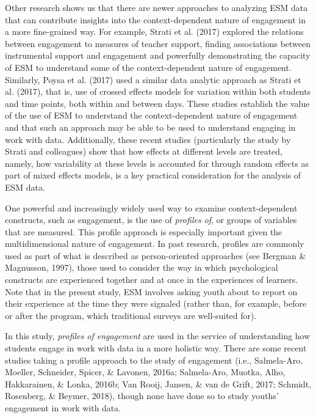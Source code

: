 \documentclass[]{msu-thesis}
\theoremstyle{definition}
\theoremstyle{definition}
\theoremstyle{definition}
\theoremstyle{remark}
\begin{document}
Other research shows us that there are newer approaches to analyzing ESM
data that can contribute insights into the context-dependent nature of
engagement in a more fine-grained way. For example, Strati et al. (2017)
explored the relations between engagement to measures of teacher
support, finding associations between instrumental support and
engagement and powerfully demonstrating the capacity of ESM to
understand some of the context-dependent nature of engagement.
Similarly, Poysa et al. (2017) used a similar data analytic approach as
Strati et al. (2017), that is, use of crossed effects models for
variation within both students and time points, both within and between
days. These studies establish the value of the use of ESM to understand
the context-dependent nature of engagement and that such an approach may
be able to be used to understand engaging in work with data.
Additionally, these recent studies (particularly the study by Strati and
colleagues) show that how effects at different levels are treated,
namely, how variability at these levels is accounted for through random
effects as part of mixed effects models, is a key practical
consideration for the analysis of ESM data.

One powerful and increasingly widely used way to examine
context-dependent constructs, such as engagement, is the use of
\emph{profiles of}, or groups of variables that are measured. This
profile approach is especially important given the multidimensional
nature of engagement. In past research, profiles are commonly used as
part of what is described as person-oriented approaches (see Bergman \&
Magnusson, 1997), those used to consider the way in which psychological
constructs are experienced together and at once in the experiences of
learners. Note that in the present study, ESM involves asking youth
about to report on their experience at the time they were signaled
(rather than, for example, before or after the program, which
traditional surveys are well-suited for).

In this study, \emph{profiles of engagement} are used in the service of
understanding how students engage in work with data in a more holistic
way. There are some recent studies taking a profile approach to the
study of engagement (i.e., Salmela-Aro, Moeller, Schneider, Spicer, \&
Lavonen, 2016a; Salmela-Aro, Muotka, Alho, Hakkarainen, \& Lonka, 2016b;
Van Rooij, Jansen, \& van de Grift, 2017; Schmidt, Rosenberg, \& Beymer,
2018), though none have done so to study youths' engagement in work with
data.
\end{document}
